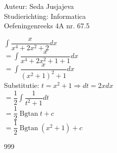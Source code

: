 \documentclass[a4paper]{article}
\newcommand{\integral}{\displaystyle\int}
\begin{document}
\noindent \large Auteur: Seda Jusjajeva\\
\noindent \large Studierichting: Informatica\\
\noindent \large Oefeningenreeks 4A nr. 67.5\\

\medskip

\normalsize


$\integral\dfrac{x}{x^4 + 2x^2 + 2}dx$ \\

$= \integral\dfrac{x}{x^4 + 2x^2 + 1 + 1}dx$ \\

$= \integral\dfrac{x}{(x^2 + 1)^2 + 1}dx$ \\

Substitutie: $t = x^2 + 1 \Rightarrow dt = 2xdx$ \\

$= \dfrac{1}{2}\integral\dfrac{1}{t^2 + 1}dt$ \\

$= \dfrac{1}{2}\operatorname{Bgtan} t + c$ \\

$= \dfrac{1}{2}\operatorname{Bgtan} (x^2 + 1) + c$ \\


\begin{thebibliography}{999}
\end{thebibliography}
\end{document}
